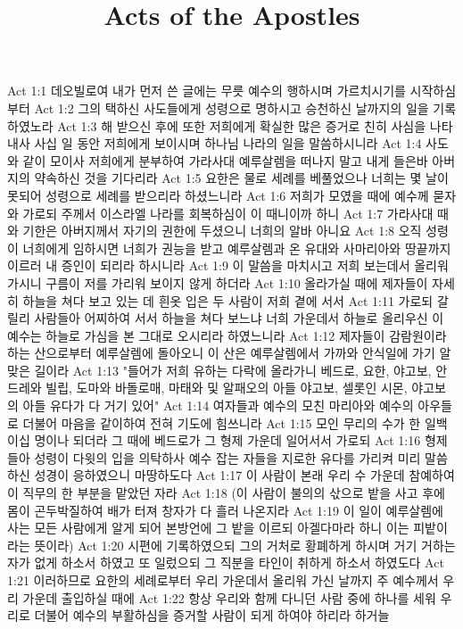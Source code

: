 

\title{Acts of the Apostles}

Act 1:1  데오빌로여 내가 먼저 쓴 글에는 무릇 예수의 행하시며 가르치시기를 시작하심부터
Act 1:2  그의 택하신 사도들에게 성령으로 명하시고 승천하신 날까지의 일을 기록하였노라
Act 1:3  해 받으신 후에 또한 저희에게 확실한 많은 증거로 친히 사심을 나타내사 사십 일 동안 저희에게 보이시며 하나님 나라의 일을 말씀하시니라
Act 1:4  사도와 같이 모이사 저희에게 분부하여 가라사대 예루살렘을 떠나지 말고 내게 들은바 아버지의 약속하신 것을 기다리라
Act 1:5  요한은 물로 세례를 베풀었으나 너희는 몇 날이 못되어 성령으로 세례를 받으리라 하셨느니라
Act 1:6  저희가 모였을 때에 예수께 묻자와 가로되 주께서 이스라엘 나라를 회복하심이 이 때니이까 하니
Act 1:7  가라사대 때와 기한은 아버지께서 자기의 권한에 두셨으니 너희의 알바 아니요
Act 1:8  오직 성령이 너희에게 임하시면 너희가 권능을 받고 예루살렘과 온 유대와 사마리아와 땅끝까지 이르러 내 증인이 되리라 하시니라
Act 1:9  이 말씀을 마치시고 저희 보는데서 올리워 가시니 구름이 저를 가리워 보이지 않게 하더라
Act 1:10  올라가실 때에 제자들이 자세히 하늘을 쳐다 보고 있는 데 흰옷 입은 두 사람이 저희 곁에 서서
Act 1:11  가로되 갈릴리 사람들아 어찌하여 서서 하늘을 쳐다 보느냐 너희 가운데서 하늘로 올리우신 이 예수는 하늘로 가심을 본 그대로 오시리라 하였느니라
Act 1:12  제자들이 감람원이라 하는 산으로부터 예루살렘에 돌아오니 이 산은 예루살렘에서 가까와 안식일에 가기 알맞은 길이라
Act 1:13  "들어가 저희 유하는 다락에 올라가니 베드로, 요한, 야고보, 안드레와 빌립, 도마와 바돌로매, 마태와 및 알패오의 아들 야고보, 셀롯인 시몬, 야고보의 아들 유다가 다 거기 있어"
Act 1:14  여자들과 예수의 모친 마리아와 예수의 아우들로 더불어 마음을 같이하여 전혀 기도에 힘쓰니라
Act 1:15  모인 무리의 수가 한 일백 이십 명이나 되더라 그 때에 베드로가 그 형제 가운데 일어서서 가로되
Act 1:16  형제들아 성령이 다윗의 입을 의탁하사 예수 잡는 자들을 지로한 유다를 가리켜 미리 말씀하신 성경이 응하였으니 마땅하도다
Act 1:17  이 사람이 본래 우리 수 가운데 참예하여 이 직무의 한 부분을 맡았던 자라
Act 1:18  (이 사람이 불의의 삯으로 밭을 사고 후에 몸이 곤두박질하여 배가 터져 창자가 다 흘러 나온지라
Act 1:19  이 일이 예루살렘에 사는 모든 사람에게 알게 되어 본방언에 그 밭을 이르되 아겔다마라 하니 이는 피밭이라는 뜻이라)
Act 1:20  시편에 기록하였으되 그의 거처로 황폐하게 하시며 거기 거하는 자가 없게 하소서 하였고 또 일렀으되 그 직분을 타인이 취하게 하소서 하였도다
Act 1:21  이러하므로 요한의 세례로부터 우리 가운데서 올리워 가신 날까지 주 예수께서 우리 가운데 출입하실 때에
Act 1:22  항상 우리와 함께 다니던 사람 중에 하나를 세워 우리로 더불어 예수의 부활하심을 증거할 사람이 되게 하여야 하리라 하거늘
